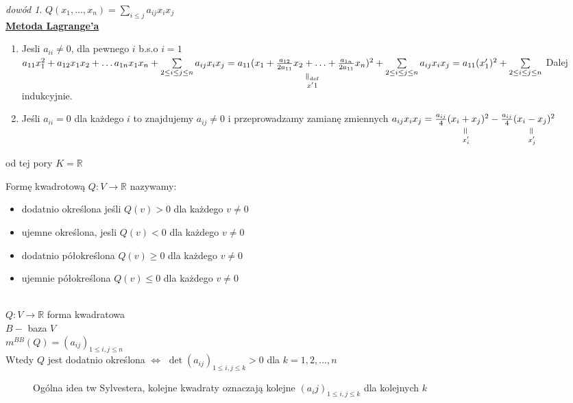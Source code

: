 \documentclass[10pt]{article}
\newcommand{\verteq}{\rotatebox{90}{$=$}}
\newcommand{\underscript}[3]{\underset{\scriptstyle{\overset{#2}{#3}}}{#1}}
\theoremstyle{definition}
\theoremstyle{definition}
\theoremstyle{definition}
\theoremstyle{definition}
\theoremstyle{remark}
\newtheorem*{dd}{dowód}
\theoremstyle{definition}
\theoremstyle{definition}
\theoremstyle{definition}
\theoremstyle{definition}
\theoremstyle{definition}
\begin{document}
\begin{dd} 
    $Q(x_1,\ldots,x_n) = \sum\limits_{i \le j} a_{ij} x_i x_j$ \\ 
    \underline{\textbf{Metoda Lagrange'a}} 
    \begin{enumerate}[(1)]
        \item Jesli $a_{ii} \neq 0$, dla pewnego $i$ b.s.o $i = 1$ \\ 
            $a_{11}x_1^2 + a_{12}x_1x_2 + \ldots a_{1n}x_1x_n + \sum\limits_{2 \le i \le j
                \le n} a_{ij}x_ix_j = a_{11}\underscript{(x_1 + \frac{a_{12}}{2a_{11}}x_2 + 
            \ldots + \frac{a_{1n}}{2a_{11}} x_n)^2}{\verteq\text{def}}{x'1} +
            \sum\limits_{2 \le i \le j \le n} a_{ij} x_i x_j = a_{11} (x'_1)^2 + 
            \sum\limits_{2 \le i \le j \le n} $ Dalej indukcyjnie. 
        \item Jeśli $a_{ii} = 0$ dla każdego $i$ to znajdujemy $a_{ij} \neq 0$ i 
            przeprowadzamy zamianę zmiennych $a_{ij}x_i x_j = 
            \frac{a_{ij}}{4} (\underscript{x_i + x_j}{\verteq}{x'_i})^2 - 
            \frac{a_{ij}}{4}(\underscript{x_i - x_j}{\verteq}{x'_j})^2 $
    \end{enumerate}
\end{dd}
od tej pory $K = \mathbb R$
\begin{df} 
    Formę kwadrotową $Q: V \to \mathbb R$ nazywamy: 
    \begin{itemize} 
        \item dodatnio określona jeśli $Q(v) > 0$ dla każdego $v \neq 0$ 
        \item ujemne określona, jesli $Q(v) < 0$ dla każdego $v \neq 0$ 
        \item dodatnio półokreślona $Q(v) \ge 0$ dla każdego $v \neq 0$ 
        \item ujemnie półokreślona $Q(v) \le 0$ dla każdego $v \neq 0$ 
    \end{itemize} 
\end{df} 
\begin{tw}[tw. Sylvestera] ~\\
    $Q: V \to \mathbb R$ forma kwadratowa \\ 
    $B -$ baza $V$ \\ 
    $m^{BB}(Q) = (a_{ij})_{1 \le i, j \le n}$ \\ 
    Wtedy $Q$ jest dodatnio określona $\Leftrightarrow$ $\det(a_{ij})_{1 \le i,j \le k}
    > 0$ dla $k = 1, 2, \ldots, n$
\end{tw} 
\begin{figure} 
    \centering
\caption{Ogólna idea tw Sylvestera, kolejne kwadraty oznaczają kolejne $(a_ij)_{1 \le i,j \le k} $ dla kolejnych $k$}
\end{figure} 
\end{document}
